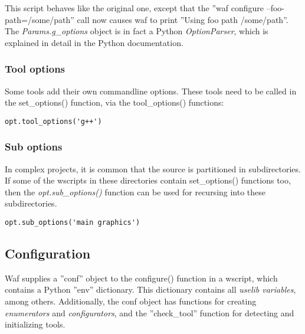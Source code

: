 \documentclass[a4,10pt]{article}
\begin{document}
This script behaves like the original one, except that the ''waf configure --foo-path=/some/path'' call now causes waf to print ''Using foo path /some/path''.\\
The \emph{Params.g\_options} object is in fact a Python \emph{OptionParser}, which is explained in detail in the Python documentation.

\subsubsection{Tool options}
Some tools add their own commandline options. These tools need to be called in the set\_options() function, via the tool\_options() functions:

\begin{center}
	\begin{lstlisting}[caption=\footnotesize Adding command-line options of the tool 'g++']
	opt.tool_options('g++')
	\end{lstlisting}
\end{center}

\subsubsection{Sub options}
In complex projects, it is common that the source is partitioned in subdirectories. If some of the wscripts in these directories contain set\_options() functions too, then the \emph{opt.sub\_options()} function can be used for recursing into these subdirectories.

\begin{center}
	\begin{lstlisting}[caption=\footnotesize Calling the set\_options() functions of the wscripts in the directories 'main' and 'graphics']
	opt.sub_options('main graphics')
	\end{lstlisting}
\end{center}

\subsection{Configuration}
Waf supplies a ''conf'' object to the configure() function in a wscript, which contains a Python ''env'' dictionary. This dictionary contains all \emph{uselib variables}, among others. Additionally, the conf object has functions for creating  \emph{enumerators} and \emph{configurators}, and the ''check\_tool'' function for detecting and initializing tools.
\end{document}

